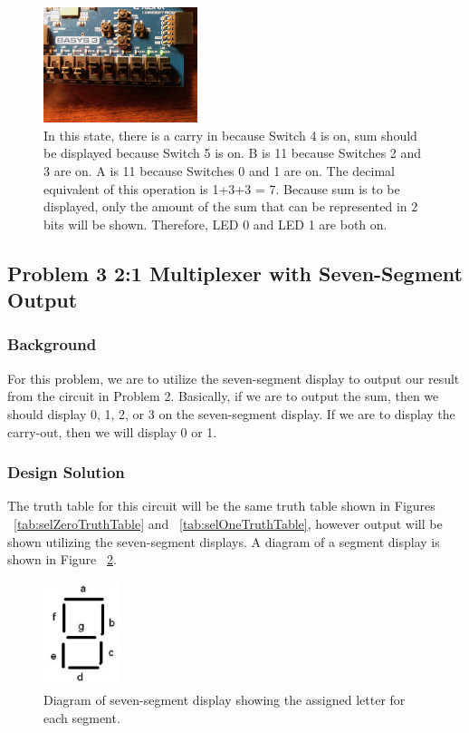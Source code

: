 \documentclass[11pt]{article}
\begin{document}
\begin{figure}[H]
\begin{center}
	\includegraphics[width=0.4\textwidth]{./report-images/Part2/IMG_0475.jpg}
	\caption{\label{fig:BitMuxAllOn}In this state, there is a carry in because Switch 4 is on, sum should be displayed because Switch 5 is on. B is 11 because Switches 2 and 3 are on. A is 11 because Switches 0 and 1 are on. The decimal equivalent of this operation is 1+3+3 = 7. Because sum is to be displayed, only the amount of the sum that can be represented in 2 bits will be shown. Therefore, LED 0 and LED 1 are both on.}
\end{center}
\end{figure}

\subsection{Problem 3 2:1 Multiplexer with Seven-Segment Output}

\subsubsection{Background}
For this problem, we are to utilize the seven-segment display to output our result from the circuit in Problem 2. Basically, if we are to output the sum, then we should display 0, 1, 2, or 3 on the seven-segment display. If we are to display the carry-out, then we will display 0 or 1.

\subsubsection{Design Solution}
The truth table for this circuit will be the same truth table shown in Figures ~\ref{tab:selZeroTruthTable} and ~\ref{tab:selOneTruthTable}, however output will be shown utilizing the seven-segment displays. A diagram of a segment display is shown in Figure ~\ref{fig:sevenSegFigure}.

\begin{figure}[h]
\begin{center}
	\includegraphics[width=0.2\textwidth]{../Lab2/report-images/img1.png}
	\caption{\label{fig:sevenSegFigure}Diagram of seven-segment display showing the assigned letter for each segment.}
\end{center}
\end{figure}
\end{document}
